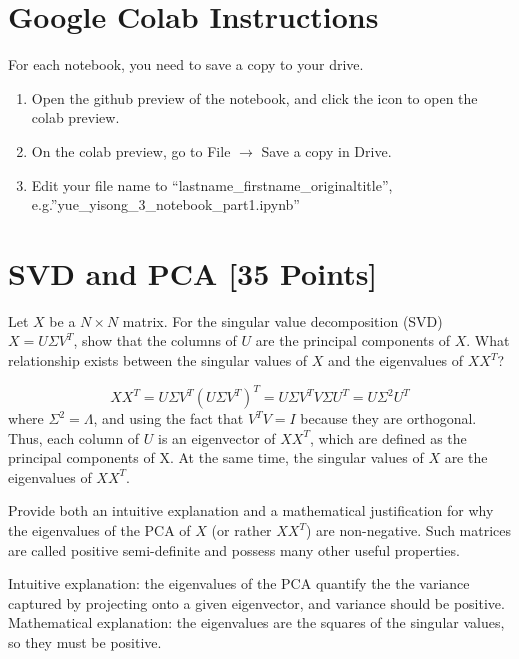 \section*{Google Colab Instructions}

For each notebook, you need to save a copy to your drive.

\begin{enumerate}
	\item Open the github preview of the notebook, and click the icon to open the colab preview.
	\item On the colab preview, go to File $\rightarrow$ Save a copy in Drive.
	\item Edit your file name to “lastname_firstname_originaltitle”, e.g.”yue_yisong_3_notebook_part1.ipynb”
\end{enumerate}


\newpage
\section{SVD and PCA [35 Points]}

\problem[3] Let $X$ be a $N \times N$ matrix. For the singular value decomposition (SVD) $X = U \Sigma V^T$, show that the columns of $U$ are the principal components of $X$. What relationship exists between the singular values of $X$ and the eigenvalues of $XX^T$?

\begin{solution}
	\begin{equation}
		XX^T = U\Sigma V^T (U\Sigma V^T)^T
		= U \Sigma V^T V \Sigma U^T
		= U \Sigma^2 U^T	
	\end{equation}
	where $\Sigma^2= \Lambda$, and using the fact that $V^TV = I$ because they are orthogonal. Thus, each column of $U$ is an eigenvector of $XX^T$, which are defined as the principal components of X. At the same time, the singular values of $X$ are the eigenvalues of $XX^T$.
\end{solution}

\problem[4] Provide both an intuitive explanation and a mathematical justification for why the eigenvalues of the PCA of $X$ (or rather $XX^T$) are non-negative. Such matrices are called positive semi-definite and possess many other useful properties.

\begin{solution}
	Intuitive explanation: the eigenvalues of the PCA quantify the the variance captured by projecting onto a given eigenvector, and variance should be positive. Mathematical explanation: the eigenvalues are the squares of the singular values, so they must be positive.
\end{solution}

